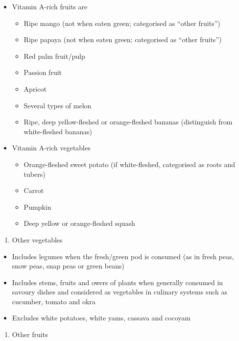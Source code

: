 \documentclass[12pt,]{book}
\providecommand{\tightlist}{%
  \setlength{\itemsep}{0pt}\setlength{\parskip}{0pt}}
\theoremstyle{definition}
\theoremstyle{definition}
\theoremstyle{definition}
\theoremstyle{remark}
\begin{document}
\begin{itemize}
\tightlist
\item
  Vitamin A-rich fruits are

  \begin{itemize}
  \tightlist
  \item
    Ripe mango (not when eaten green; categorised as ``other fruits'')
  \item
    Ripe papaya (not when eaten green; categorised as ``other fruits'')
  \item
    Red palm fruit/pulp
  \item
    Passion fruit
  \item
    Apricot
  \item
    Several types of melon
  \item
    Ripe, deep yellow-fleshed or orange-fleshed bananas (distinguish
    from white-fleshed bananas)
  \end{itemize}
\item
  Vitamin A-rich vegetables

  \begin{itemize}
  \tightlist
  \item
    Orange-fleshed sweet potato (if white-fleshed, categorised as roots
    and tubers)
  \item
    Carrot
  \item
    Pumpkin
  \item
    Deep yellow or orange-fleshed squash
  \end{itemize}
\end{itemize}

\begin{enumerate}
\def\labelenumi{\arabic{enumi}.}
\setcounter{enumi}{8}
\tightlist
\item
  Other vegetables
\end{enumerate}

\begin{itemize}
\tightlist
\item
  Includes legumes when the fresh/green pod is consumed (as in fresh
  peas, snow peas, snap peas or green beans)
\item
  Includes stems, fruits and owers of plants when generally consumed in
  savoury dishes and considered as vegetables in culinary systems such
  as cucumber, tomato and okra
\item
  Excludes white potatoes, white yams, cassava and cocoyam
\end{itemize}

\begin{enumerate}
\def\labelenumi{\arabic{enumi}.}
\setcounter{enumi}{9}
\tightlist
\item
  Other fruits
\end{enumerate}
\end{document}
